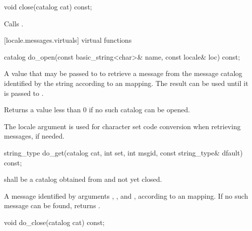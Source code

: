 %
%
\begin{itemdecl}
void  close(catalog cat) const;
\end{itemdecl}

\begin{itemdescr}
\pnum
\effects
Calls
.
\end{itemdescr}

[locale.messages.virtuals]{ virtual functions}

%
%
\begin{itemdecl}
catalog do_open(const basic_string<char>& name,
                const locale& loc) const;
\end{itemdecl}

\begin{itemdescr}
\pnum
\returns
A value that may be passed to
to retrieve a message from the message catalog identified by the string
 according to an  mapping.
The result can be used until it is passed to
.

\pnum
Returns a value less than 0 if no such catalog can be opened.

\pnum
\notes
The locale argument 
is used for character set code conversion when retrieving
messages, if needed.
\end{itemdescr}

%
%
\begin{itemdecl}
string_type do_get(catalog cat, int set, int msgid,
              const string_type& dfault) const;
\end{itemdecl}

\begin{itemdescr}
\pnum
\requires
{} shall be a catalog obtained from
and not yet closed.

\pnum
\returns
A message identified by arguments , , and , according
to an  mapping. If no
such message can be found, returns .
\end{itemdescr}

%
%
\begin{itemdecl}
void do_close(catalog cat) const;
\end{itemdecl}

